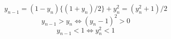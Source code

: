 \[ y_{n-1}=(1-y_n)\{(1+y_n)/2\}+y_n^2=(y_n^2+1)/2\]
\[ y_{n-1}>y_n\Leftrightarrow(y_n-1)^2>0\]
\[ y_{n-1}<1\Leftrightarrow y_n^2<1\]
